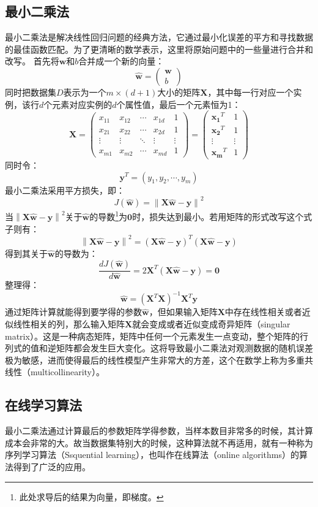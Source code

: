 \documentclass[12pt,a4paper,draft]{ctexart}
\begin{document}
\subsection{最小二乘法}
最小二乘法是解决线性回归问题的经典方法，它通过最小化误差的平方和寻找数据的最佳函数匹配。为了更清晰的数学表示，这里将原始问题中的一些量进行合并和改写。
首先将$ \bm{w} $和$ b $合并成一个新的向量：
\[ \hat{\bm{w}}=\begin{pmatrix}
\bm{w} \\ 
b
\end{pmatrix}  \]
同时把数据集$ D $表示为一个$ m\times(d+1) $大小的矩阵$ \bm{X} $，其中每一行对应一个实例，该行$ d $个元素对应实例的$ d $个属性值，最后一个元素恒为1：
\[ 
\bm{X}=
\begin{pmatrix}
	x_{11} & x_{12} & \cdots & x_{1d} & 1 \\ 
	x_{21} & x_{22} & \cdots & x_{2d} & 1 \\ 
	\vdots & \vdots & \ddots & \vdots & \vdots \\ 
	x_{m1} & x_{m2} & \cdots & x_{md} & 1
\end{pmatrix} =\begin{pmatrix}
\bm{x_1}^T & 1 \\ 
\bm{x_2}^T & 1 \\ 
\vdots & \vdots \\ 
\bm{x_m}^T & 1
\end{pmatrix} 
\]
同时令：
\[ \bm{y}^T=(y_1,y_2,\cdots,y_m) \]
最小二乘法采用平方损失，即： 
\[ J(\bm{\hat{w}})=\left \| \bm{X}\bm{\hat{w}}-\bm{y} \right \|^{2} \]
当$ \left \| \bm{X}\bm{\hat{w}}-\bm{y} \right \|^{2} $关于$ \hat{\bm{w}} $的导数\footnote{此处求导后的结果为向量，即梯度。}为$ \bm{0} $时，损失达到最小。若用矩阵的形式改写这个式子则有： 
\[ \left \| \bm{X}\bm{\hat{w}}-\bm{y} \right \|^{2}=(\bm{X}\bm{\hat{w}}-\bm{y})^T(\bm{X}\bm{\hat{w}}-\bm{y}) \]
得到其关于$ \bm{\hat{w}} $的导数为： 
\[ \frac{dJ(\bm{\hat{w}})}{d\bm{\hat{w}}}=2\bm{X}^T(\bm{X}\hat{\bm{w}}-\bm{y})=\bm{0} \]
整理得： 
\[ \hat{\bm{w}}=(\bm{X}^T\bm{X})^{-1}\bm{X}^T\bm{y} \]
通过矩阵计算就能得到要学得的参数$ \bm{\hat{w}} $，但如果输入矩阵$ \bm{X} $中存在线性相关或者近似线性相关的列，那么输入矩阵$ \bm{X} $就会变成或者近似变成奇异矩阵（singular matrix）。这是一种病态矩阵，矩阵中任何一个元素发生一点变动，整个矩阵的行列式的值和逆矩阵都会发生巨大变化。这将导致最小二乘法对观测数据的随机误差极为敏感，进而使得最后的线性模型产生非常大的方差，这个在数学上称为多重共线性（multicollinearity）。
\subsection{在线学习算法}
最小二乘法通过计算最后的参数矩阵学得参数，当样本数目非常多的时候，其计算成本会非常的大。故当数据集特别大的时候，这种算法就不再适用，就有一种称为序列学习算法（Ssquential learning），也叫作在线算法（online algorithms）的算法得到了广泛的应用。
\end{document}

